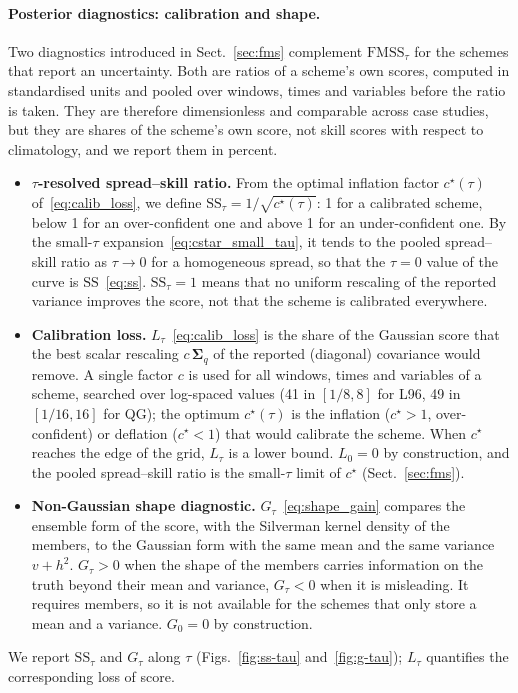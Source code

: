 \paragraph{Posterior diagnostics: calibration and shape.}
Two diagnostics introduced in Sect.~\ref{sec:fms} complement $\mathrm{FMSS}_\tau$ for the
schemes that report an uncertainty. Both are ratios of a scheme's own scores, computed
in standardised units and pooled over windows, times and variables before the ratio is
taken. They are therefore dimensionless and comparable across case studies, but they are
shares of the scheme's own score, not skill scores with respect to climatology, and we
report them in percent.
\begin{itemize}[leftmargin=*,nosep]
  \item \textbf{$\tau$-resolved spread--skill ratio.} From the optimal inflation factor
    $c^\star(\tau)$ of~\eqref{eq:calib_loss}, we define
    $\mathrm{SS}_\tau = 1/\sqrt{c^\star(\tau)}$: 1 for a calibrated scheme, below 1 for an
    over-confident one and above 1 for an under-confident one. By the small-$\tau$
    expansion~\eqref{eq:cstar_small_tau}, it tends to the pooled spread--skill ratio as
    $\tau \to 0$ for a homogeneous spread, so that the $\tau = 0$ value of the curve is
    $\mathrm{SS}$~\eqref{eq:ss}. $\mathrm{SS}_\tau = 1$ means that no uniform rescaling of
    the reported variance improves the score, not that the scheme is calibrated everywhere.
  \item \textbf{Calibration loss.} $L_\tau$~\eqref{eq:calib_loss} is the
    share of the Gaussian score that the best scalar rescaling $c\,\boldsymbol{\Sigma}_q$
    of the reported (diagonal) covariance would remove. A single factor $c$ is used for
    all windows, times and variables of a scheme, searched over log-spaced values (41 in
    $[1/8, 8]$ for L96, 49 in $[1/16, 16]$ for QG); the optimum $c^\star(\tau)$ is the inflation ($c^\star > 1$, over-confident)
    or deflation ($c^\star < 1$) that would calibrate the scheme. When $c^\star$ reaches
    the edge of the grid, $L_\tau$ is a lower bound. $L_0 = 0$ by construction, and the
    pooled spread--skill ratio is the small-$\tau$ limit of $c^\star$
    (Sect.~\ref{sec:fms}).
  \item \textbf{Non-Gaussian shape diagnostic.} $G_\tau$~\eqref{eq:shape_gain} compares
    the ensemble form of the score, with the Silverman kernel density of the members, to
    the Gaussian form with the same mean and the same variance $v + h^2$. $G_\tau > 0$
    when the shape of the members carries information on the truth beyond their mean and
    variance, $G_\tau < 0$ when it is misleading. It requires members, so it is not
    available for the schemes that only store a mean and a variance. $G_0 = 0$ by
    construction.
\end{itemize}
We report $\mathrm{SS}_\tau$ and $G_\tau$ along $\tau$ (Figs.~\ref{fig:ss-tau}
and~\ref{fig:g-tau}); $L_\tau$ quantifies the corresponding loss of score.

